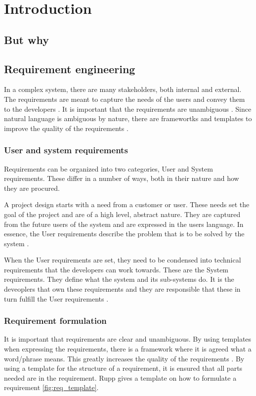 \chapter{Introduction}
\section{But why}
\section{Requirement engineering}
In a complex system, there are many stakeholders, both internal and external.
The requirements are meant to capture the needs of the users and convey them to
the developers \cite{ibm_req}. It is important that the requirements are
unambiguous \cite{ibm_req, rupp2014}. Since natural language is ambiguous by
nature, there are framewortks and templates to improve the quality of the
requirements \cite{rupp2014}. 

\subsection{User and system requirements}
Requirements can be organized into two categories, User and System requirements.
These differ in a number of ways, both in their nature and how they are
procured.

A project design starts with a need from a customer or user. These needs set the
goal of the project and are of a high level, abstract nature. They are captured
from the future users of the system and are expressed in the users language. In
essence, the User requirements describe the problem that is to be solved by the
system \cite{ibm_req}. 

When the User requirements are set, they need to be condensed into technical
requirements that the developers can work towards. These are the System
requirements. They define what the system and its sub-systems do. It is the
deveoplers that own these requirements and they are responsible that these in
turn fulfill the User requirements \cite{ibm_req}.

\subsection{Requirement formulation}
It is important that requirements are clear and unambiguous. By using templates
when expressing the requirements, there is a framework where it is agreed what a
word/phrase means. This greatly increases the quality of the requirements
\cite{rupp2014}. By using a template for the structure of a requirement, it is
ensured that all parts needed are in the requirement. Rupp \cite{rupp2014}
gives a template on how to formulate a requirement \ref{fig:req_template}.

